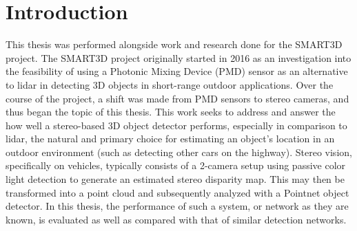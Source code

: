 \section{Introduction} %
This thesis was performed alongside work and research done for the SMART3D project. The SMART3D project originally started in 2016 as an investigation into the feasibility of using a Photonic Mixing Device (PMD) sensor as an alternative to lidar in detecting 3D objects in short-range outdoor applications. Over the course of the project, a shift was made from PMD sensors to stereo cameras, and thus began the topic of this thesis. This work seeks to address and answer the how well a stereo-based 3D object detector performs, especially in comparison to lidar, the natural and primary choice for estimating an object's location in an outdoor environment (such as detecting other cars on the highway). Stereo vision, specifically on vehicles, typically consists of a 2-camera setup using passive color light detection to generate an estimated stereo disparity map. This may then be transformed into a point cloud and subsequently analyzed with a Pointnet object detector. In this thesis, the performance of such a system, or network as they are known, is evaluated as well as compared with that of similar detection networks. 



